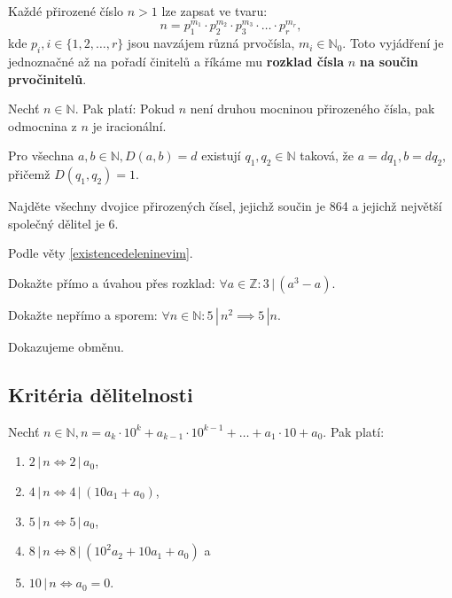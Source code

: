 \begin{veta}
  Každé přirozené číslo $n>1$ lze zapsat ve tvaru:
  $$n=p_1^{m_1}\cdot p_2^{m_2} \cdot p_3^{m_3}\cdot \hdots \cdot p_r^{m_r},$$
  kde $p_i,i\in\{ 1, 2, \dots, r \}$ jsou navzájem různá prvočísla, $m_i\in \mathbb N_0$. Toto vyjádření je jednoznačné až na pořadí činitelů a říkáme mu \textbf{rozklad čísla} $n$ \textbf{na součin prvočinitelů}.
\end{veta}

\begin{veta}
  Nechť $n\in \mathbb N.$ Pak platí: Pokud $n$ není druhou mocninou přirozeného čísla, pak odmocnina z $n$ je iracionální.
\end{veta}

\begin{veta}\label{existencedeleninevim}
    Pro všechna $a,b \in \mathbb N, D(a,b)=d$ existují $q_1, q_2\in \mathbb N$ taková,
    že $a=dq_1, b=dq_2, $ přičemž $D(q_1, q_2)=1.$
\end{veta}

\begin{priklad}
Najděte všechny dvojice přirozených čísel, jejichž součin je 864 a jejichž největší společný dělitel je 6.
\end{priklad}

\begin{reseni}
Podle věty \ref{existencedeleninevim}.
\end{reseni}

\begin{priklad}
Dokažte přímo a úvahou přes rozklad: $\forall a \in \mathbb Z: 3\, | \, (a^3-a).$
\end{priklad}

\begin{priklad}
Dokažte nepřímo a sporem: $\forall n \in \mathbb N: 5 \, | \, n^2 \implies 5 \, | n.$
\end{priklad}

\begin{reseni}
Dokazujeme obměnu.
\end{reseni}

\subsection*{Kritéria dělitelnosti}
\begin{veta}
  Nechť $n\in \mathbb N, n=a_k\cdot 10^k+a_{k-1}\cdot 10^{k-1}+\dots + a_1\cdot 10 + a_0.$ Pak platí:
  \begin{enumerate}[$i.$]
    \item $2 \, | \, n \iff 2 \, | \, a_0$,
    \item $4 \, | \, n \iff 4 \, | \, (10a_1 + a_0)$,
    \item $5 \, | \, n \iff 5 \, | \, a_0$,
    \item $8 \, | \, n \iff 8 \, | \, (10^2a_2 + 10a_1 + a_0)$ a
    \item $10 \, | \, n \iff a_0 = 0$.
  \end{enumerate}
\end{veta}

